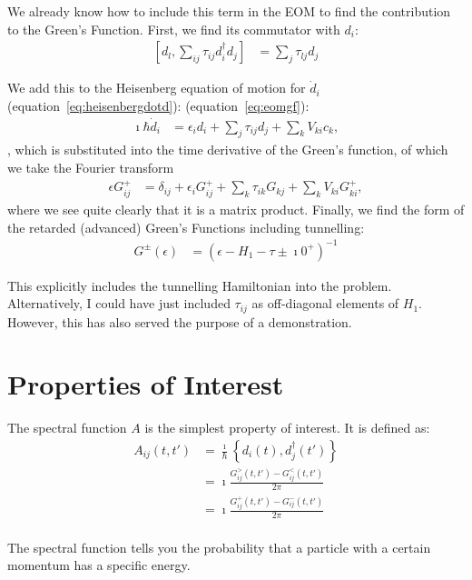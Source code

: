 We already know how to include this term in the EOM to find the contribution to the Green's Function. First, we find its commutator with $d_i$:
\begin{align*}
\left[ d_l, \sum_{ij} \tau_{ij} d_i^\dagger d_j\right] &= \sum_j \tau_{lj} d_j
\end{align*}

We add this to the Heisenberg equation of motion for $\dot{d}_i$ (equation~\ref{eq:heisenbergdotd}): (equation~\ref{eq:eomgf}):
\begin{align*}
\imath \hbar \dot{d}_i 
&= \epsilon_i d_i +  \sum_{j} \tau_{ij} d_j + \sum_{k}V_{ki} c_{k},
\end{align*}
, which is substituted into the time derivative of the Green's function, of which we take the Fourier transform
\begin{align*}
\epsilon G_{ij}^+ &= \delta_{ij} + \epsilon_i G^+_{ij}+ \sum_k \tau_{ik} G_{kj} + \sum_k V_{ki} G^+_{ki},
\end{align*}
where we see quite clearly that it is a matrix product. Finally, we find the form of the retarded (advanced) Green's Functions including tunnelling:
\begin{align*}
G^\pm(\epsilon) &= \left(\epsilon - H_1 - \tau \pm \imath 0^+\right)^{-1} 
\end{align*}

This explicitly includes the tunnelling Hamiltonian into the problem. Alternatively, I could have just included $\tau_{ij}$ as off-diagonal elements of $H_1$. However, this has also served the purpose of a demonstration.


\section{Properties of Interest}
\label{sec:properties}
The spectral function $A$ is the simplest property of interest. It is defined as\cite{seldenthuis}:
\begin{align}
A_{ij}(t, t') &= \frac{\imath}{\hbar} \left\{ d_i(t), d_j^\dagger(t')\right\} \\
&= \imath \frac{ G^>_{ij}(t, t') - G^<_{ij}(t, t')}{2\pi} \\
&= \imath \frac{G^+_{ij}(t, t') - G^-_{ij}(t, t')}{2\pi}\\
\label{eq:spectral}
\end{align}

The spectral function tells you the probability that a particle with a certain momentum has a specific energy. 

